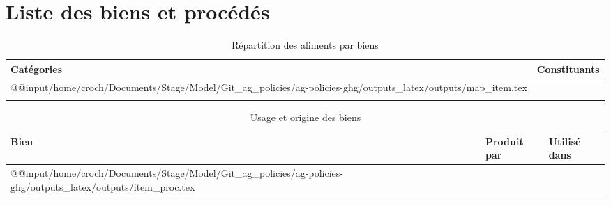\section{Liste des biens et procédés}\label{annexe:item_pord}

\begin{longtable}[h]{p{1.5in}p{4.5in}}
    \textbf{Catégories} & \textbf{Constituants} \\         \hline
    \endfirsthead
    \endhead
    \csname @@input\endcsname /home/croch/Documents/Stage/Model/Git_ag_policies/ag-policies-ghg/outputs_latex/outputs/map_item.tex
    \hline                                      \\
    \caption{Répartition des aliments par biens}
\end{longtable}

\begin{longtable}[h]{p{1.5in}p{2.5in}p{1.8in}}
    \textbf{Bien} & \textbf{Produit par} & \textbf{Utilisé dans} \\         \hline
    \endfirsthead
    \endhead
    \csname @@input\endcsname /home/croch/Documents/Stage/Model/Git_ag_policies/ag-policies-ghg/outputs_latex/outputs/item_proc.tex
    \hline                                                       \\
    \caption{Usage et origine des biens}
\end{longtable}
